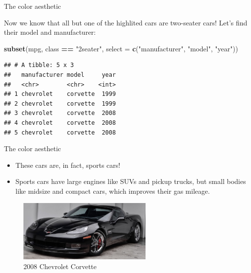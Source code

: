 \documentclass[ignorenonframetext,]{beamer}
\newenvironment{Shaded}{\begin{snugshade}}{\end{snugshade}}
\newcommand{\DataTypeTok}[1]{\textcolor[rgb]{0.13,0.29,0.53}{#1}}
\newcommand{\KeywordTok}[1]{\textcolor[rgb]{0.13,0.29,0.53}{\textbf{#1}}}
\newcommand{\NormalTok}[1]{#1}
\newcommand{\OperatorTok}[1]{\textcolor[rgb]{0.81,0.36,0.00}{\textbf{#1}}}
\newcommand{\StringTok}[1]{\textcolor[rgb]{0.31,0.60,0.02}{#1}}
\begin{document}
\begin{frame}[fragile]{The color aesthetic}
\protect\hypertarget{the-color-aesthetic-2}{}

Now we know that all but one of the highlited cars are two-seater cars!
Let's find their model and manufacturer:

\begin{Shaded}
\begin{Highlighting}[]
\KeywordTok{subset}\NormalTok{(mpg, class }\OperatorTok{==}\StringTok{ "2seater"}\NormalTok{, }
       \DataTypeTok{select =} \KeywordTok{c}\NormalTok{(}\StringTok{"manufacturer"}\NormalTok{, }\StringTok{"model"}\NormalTok{, }\StringTok{"year"}\NormalTok{))}
\end{Highlighting}
\end{Shaded}

\begin{verbatim}
## # A tibble: 5 x 3
##   manufacturer model     year
##   <chr>        <chr>    <int>
## 1 chevrolet    corvette  1999
## 2 chevrolet    corvette  1999
## 3 chevrolet    corvette  2008
## 4 chevrolet    corvette  2008
## 5 chevrolet    corvette  2008
\end{verbatim}

\end{frame}

\begin{frame}{The color aesthetic}
\protect\hypertarget{the-color-aesthetic-3}{}

\begin{itemize}
\item
  These cars are, in fact, sports cars!
\item
  Sports cars have large engines like SUVs and pickup trucks, but small
  bodies like midsize and compact cars, which improves their gas
  mileage.
\end{itemize}

\begin{figure}
\centering
\includegraphics[width=2.60417in,height=\textheight]{figures/cc.jpg}
\caption{2008 Chevrolet Corvette}
\end{figure}

\end{frame}
\end{document}
